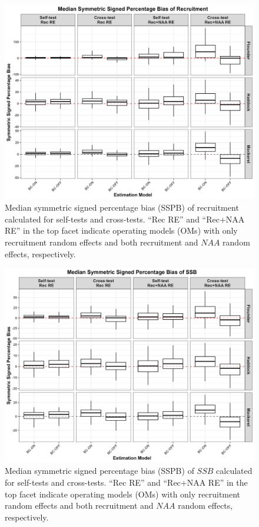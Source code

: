 \documentclass[
  12pt,
]{article}
\begin{document}
\begin{figure}[H]
    \centering
    \includegraphics[width=\textwidth]{Revised_Figures&Tables/Median_Rec_SSPB.PNG}
    \caption{Median symmetric signed percentage bias (SSPB) of recruitment calculated for self-tests and cross-tests. ``Rec RE'' and ``Rec+NAA RE'' in the top facet indicate operating models (OMs) with only recruitment random effects and both recruitment and $NAA$ random effects, respectively.}
    \label{fig:supp_Rec_SSPB}
\end{figure}

\begin{figure}[H]
    \centering
    \includegraphics[width=\textwidth]{Revised_Figures&Tables/Median_SSB_SSPB.PNG}
    \caption{Median symmetric signed percentage bias (SSPB) of $SSB$ calculated for self-tests and cross-tests. ``Rec RE'' and ``Rec+NAA RE'' in the top facet indicate operating models (OMs) with only recruitment random effects and both recruitment and $NAA$ random effects, respectively.}
    \label{fig:supp_SSB_SSPB}
\end{figure}
\end{document}
